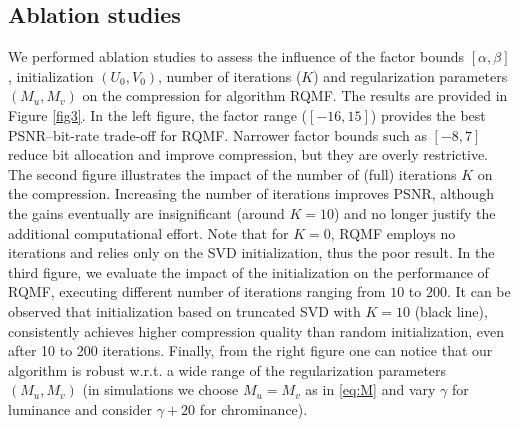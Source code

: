 \documentclass[lettersize,journal]{IEEEtran}
\begin{document}
\subsection{Ablation studies}
\noindent We performed ablation studies to assess the influence of the factor bounds $[\alpha, \beta]$, initialization $(U_0,V_0)$, number of iterations ($K$) and regularization parameters $(M_u,M_v)$ on the compression for algorithm RQMF. The results are provided in  Figure  \ref{fig3}. In the left figure, the factor range ($\left[-16,15\right]$) provides the best PSNR–bit-rate trade-off for RQMF. Narrower factor bounds such as $\left[-8,7\right]$ reduce bit allocation and improve compression, but they are overly restrictive. The second figure illustrates the impact of the number of (full) iterations $K$ on the compression. Increasing the number of  iterations improves PSNR, although the gains eventually are insignificant (around $K=10$) and no longer justify the additional computational effort. Note that for $K=0$, RQMF employs no iterations and relies only on the SVD initialization, thus the poor result. In the third figure, we evaluate the impact of the initialization  on the performance of RQMF, executing  different number of iterations ranging from $10$ to $200$. It can be observed that initialization based on truncated SVD with $K=10$ (black line), consistently achieves higher compression quality than random initialization, even after 10 to 200 iterations.  Finally, from the right figure one can notice that our algorithm is robust w.r.t. a wide range of the regularization parameters $(M_u,M_v)$ (in simulations we choose $M_u = M_v$ as in \eqref{eq:M} and vary $\gamma$ for luminance and consider $\gamma+20$ for chrominance). 


\end{document}
